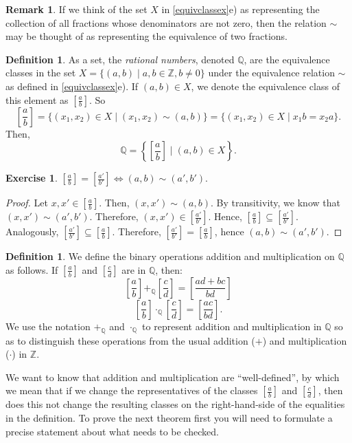 \documentclass[11pt]{article}
\newcommand{\bbQ}{\mathbb{Q}}
\newcommand{\bbZ}{\mathbb{Z}}
\renewcommand{\_}[1]{\underline{ #1 }}
\theoremstyle{definition}
\newtheorem{definition}[theorem]{Definition}
\newtheorem{exercise}[theorem]{Exercise}
\newtheorem{remark}[theorem]{Remark}
\numberwithin{equation}{subsection}
\begin{document}
\begin{remark}  
If we think of the set $X$ in \ref{equivclassex}e) as representing the collection of all fractions whose denominators are not
zero, then the relation $\sim$ may be thought of as representing the equivalence of two fractions.
\end{remark}  

\begin{definition}
As a set, the {\em rational numbers}, denoted $\bbQ$, are the equivalence classes in the set $X=\{(a,b)\mid a,b\in \mathbb{Z}, b\neq 0\}$ under
the equivalence relation $\sim$ as defined in \ref{equivclassex}e).
If $(a,b)\in X$, we denote the equivalence class of this element as $\left[ \frac{a}{b}\right]$.   So
$$\left[\frac{a}{b}\right]=\{(x_1,x_2)\in X\mid (x_1,x_2)\sim (a,b)\}=\{(x_1,x_2)\in X\mid x_1 b=x_2 a\}.$$
Then,
$$
\bbQ=\left\{ {\left[\frac{a}{b}\right]} \mid (a,b)\in X\right\}.
$$
\end{definition}

\begin{exercise}
$\displaystyle \left[\frac{a}{b}\right]=\displaystyle \left[\frac{a'}{b'}\right]\Longleftrightarrow (a,b)\sim (a',b').$
\begin{proof}
Let $x, x' \in [\frac{a}{b}]$. Then, $(x,x') \sim (a,b)$. By transitivity, we know that $(x,x')\sim(a',b')$. Therefore, $(x,x') \in [\frac{a'}{b'}]$. Hence, $[\frac{a}{b}] \subseteq [\frac{a'}{b'}]$. Analogously, $[\frac{a'}{b'}] \subseteq [\frac{a}{b}]$. Therefore, $[\frac{a'}{b'}] = [\frac{a}{b}]$, hence $(a,b) \sim (a',b')$.

\renewcommand\qedsymbol{QED}
\end{proof}

\end{exercise}

\begin{definition}
We define the binary operations addition and multiplication on $\bbQ$ as follows.  If $\displaystyle \left[ \frac{a}{b}\right]$ and $\displaystyle \left[\frac{c}{d}\right]$ are in $\bbQ$, then:
$$
\left[\frac{a}{b}\right]+_\bbQ \left[\frac{c}{d}\right]=\left[\frac{ad+bc}{bd}\right]
$$
$$
\left[\frac{a}{b}\right]\cdot_\bbQ \left[\frac{c}{d}\right]=\left[\frac{ac}{ bd}\right].
$$
We use the notation $+_\bbQ$ and $\cdot_\bbQ$ to represent addition and multiplication in $\bbQ$
so as to distinguish these operations from the usual addition ($+$) and multiplication ($\cdot$) in $\bbZ$.
\end{definition}


We want to know that addition and multiplication are ``well-defined'', by which we mean that if we change the representatives of the
classes $\left[\frac{a}{b}\right]$ and $\left[\frac{c}{d}\right]$, then does this not change the
resulting classes on the right-hand-side of the equalities in the definition.  To prove the next theorem first you will need to formulate a precise statement about what needs to be checked.
\end{document}

